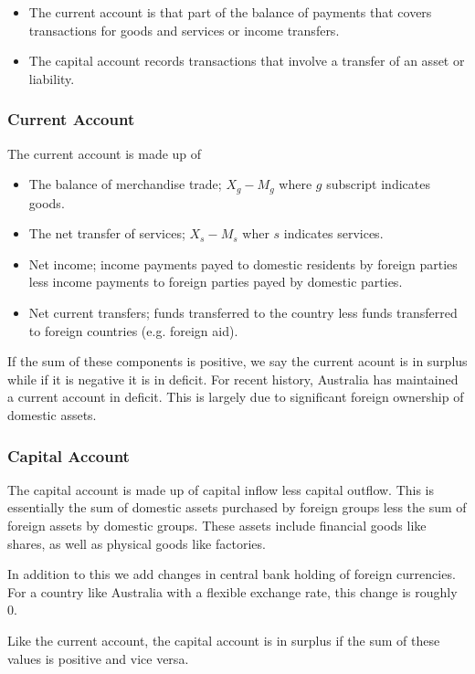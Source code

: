 \documentclass[12pt]{report}
\begin{document}
\begin{flushleft}
\begin{itemize}
    \item The current account is that part of the balance of payments that
        covers transactions for goods and services or income transfers.
    \item The capital account records transactions that involve a transfer of
        an asset or liability.
\end{itemize}

\subsubsection*{Current Account}

The current account is made up of

\begin{itemize}
    \item The balance of merchandise trade; \(X_g - M_g\) where \(g\) subscript
        indicates goods.
    \item The net transfer of services; \(X_s - M_s\) wher \(s\) indicates
        services.
    \item Net income; income payments payed to domestic residents by foreign
        parties less income payments to foreign parties payed by domestic
        parties.
    \item Net current transfers; funds transferred to the country less funds
        transferred to foreign countries (e.g. foreign aid).
\end{itemize}

If the sum of these components is positive, we say the current acount is in
surplus while if it is negative it is in deficit. For recent history, Australia
has maintained a current account in deficit. This is largely due to significant
foreign ownership of domestic assets.

\subsubsection*{Capital Account}

The capital account is made up of capital inflow less capital outflow. This is
essentially the sum of domestic assets purchased by foreign groups less the sum
of foreign assets by domestic groups. These assets include financial goods like
shares, as well as physical goods like factories. \par
In addition to this we add changes in central bank holding of foreign
currencies. For a country like Australia with a flexible exchange rate, this
change is roughly \(0\). \par
Like the current account, the capital account is in surplus if the sum of these
values is positive and vice versa.


\end{flushleft}
\end{document}
